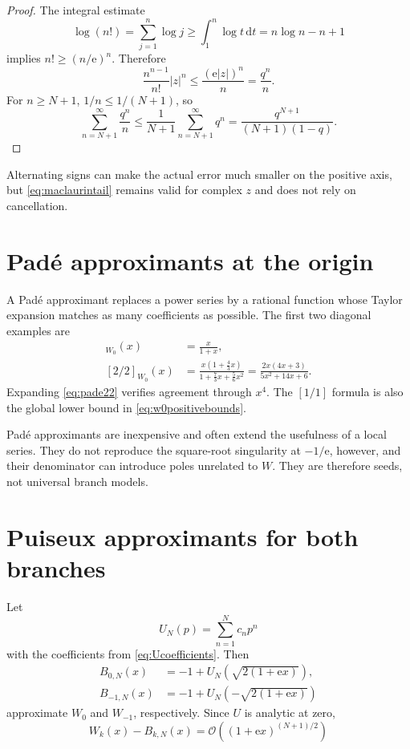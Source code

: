 \documentclass[11pt,openany]{book}
\newcommand{\e}{\mathrm{e}}
\newcommand{\dd}{\,\mathrm{d}}
\newcommand{\bigO}{\mathcal{O}}
\newcommand{\abs}[1]{\left|#1\right|}
\theoremstyle{plain}
\theoremstyle{definition}
\theoremstyle{remark}
\begin{document}
\begin{proof}
The integral estimate
\[
 \log(n!)=\sum_{j=1}^n\log j
 \ge\int_1^n\log t\dd t
 =n\log n-n+1
\]
implies \(n!\ge(n/\e)^n\).  Therefore
\[
 \frac{n^{n-1}}{n!}\abs z^n\le\frac{(\e\abs z)^n}{n}=\frac{q^n}{n}.
\]
For \(n\ge N+1\), \(1/n\le1/(N+1)\), so
\[
 \sum_{n=N+1}^{\infty}\frac{q^n}{n}
 \le\frac1{N+1}\sum_{n=N+1}^{\infty}q^n
 =\frac{q^{N+1}}{(N+1)(1-q)}.
\]
\end{proof}

Alternating signs can make the actual error much smaller on the positive axis,
but \eqref{eq:maclaurintail} remains valid for complex \(z\) and does not
rely on cancellation.

\section{Pad\'{e} approximants at the origin}
A Pad\'{e} approximant replaces a power series by a rational function whose
Taylor expansion matches as many coefficients as possible.  The first two
diagonal examples are
\begin{align}
 [1/1]_{W_0}(x)&=\frac{x}{1+x},\label{eq:pade11}\\
 [2/2]_{W_0}(x)&=
 \frac{x(1+\frac43x)}{1+\frac73x+\frac56x^2}
 =\frac{2x(4x+3)}{5x^2+14x+6}.
\label{eq:pade22}
\end{align}
Expanding \eqref{eq:pade22} verifies agreement through \(x^4\).  The
\([1/1]\) formula is also the global lower bound in
\eqref{eq:w0positivebounds}.

Pad\'{e} approximants are inexpensive and often extend the usefulness of a
local series.  They do not reproduce the square-root singularity at
\(-1/\e\), however, and their denominator can introduce poles unrelated to
\(W\).  They are therefore seeds, not universal branch models.

\section{Puiseux approximants for both branches}
Let
\[
 U_N(p)=\sum_{n=1}^{N}c_np^n
\]
with the coefficients from \eqref{eq:Ucoefficients}.  Then
\begin{align}
 B_{0,N}(x)&=-1+U_N\!\left(\sqrt{2(1+\e x)}\right),\\
 B_{-1,N}(x)&=-1+U_N\!\left(-\sqrt{2(1+\e x)}\right)
\end{align}
approximate \(W_0\) and \(W_{-1}\), respectively.  Since \(U\) is analytic
at zero,
\[
 W_k(x)-B_{k,N}(x)=\bigO\left((1+\e x)^{(N+1)/2}\right)
\]
\end{document}
